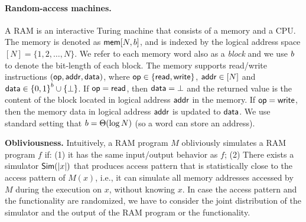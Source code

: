 \paragraph{Random-access machines.}
A RAM is an interactive Turing machine that consists of a memory and a CPU.  The
memory is denoted as ${\mathsf{mem}}[{N},{b}]$, and is indexed by the logical
address space $[N] = \{1,2,\ldots,N\}$. We refer to each memory word also as a
\emph{block} and we use $b$ to denote the bit-length of each block. The memory supports read/write
instructions $(\mathsf{op},{\mathsf{addr}}, {\mathsf{data}})$, where $\mathsf{op} \in \{{\mathsf{read}},{\mathsf{write}}\}$, ${\mathsf{addr}} \in
[N]$ and ${\mathsf{data}} \in {\{0,1\}}^{b} \cup \{\bot\}$.  If $\mathsf{op} = {\mathsf{read}}$, then
${\mathsf{data}}=\bot$ and the returned value is the content of the block located in
logical address ${\mathsf{addr}}$ in the memory. If $\mathsf{op}={\mathsf{write}}$, then the memory data in
logical address ${\mathsf{addr}}$ is updated to ${\mathsf{data}}$.
We use standard setting that ${b} = \Theta(\log N)$ (so a word can 
store an address).

\medskip
\noindent
{\bf Obliviousness.}
Intuitively, a RAM program $M$ obliviously simulates a RAM program $f$ if: (1) it has the same input/output behavior as $f$; (2) There exists a simulator ${\sf Sim}(\lvert x\rvert)$ that produces access pattern that is statistically close to the access pattern of $M(x)$, i.e., it can simulate all memory addresses accessed by $M$ during the execution on $x$, without knowing $x$. In case the access pattern and the functionality are randomized, we have to consider the joint distribution of the simulator and the output of the RAM program or the functionality. 


